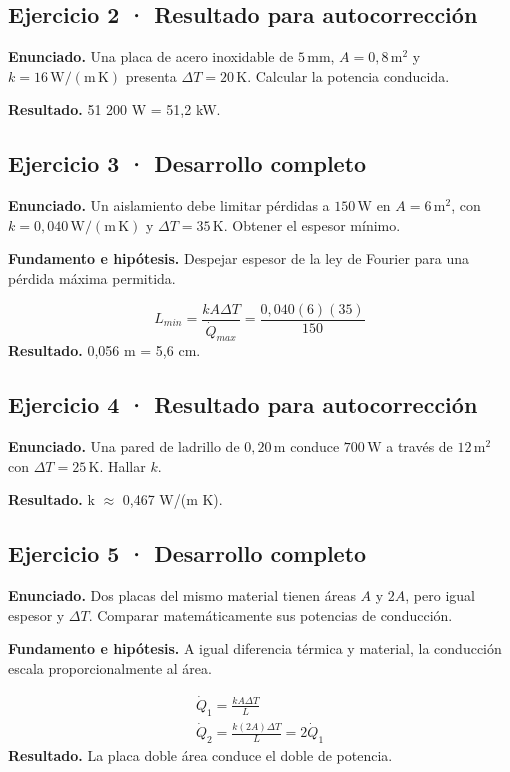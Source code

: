 \documentclass[11pt,a4paper]{article}
\begin{document}
\subsection*{Ejercicio 2 · Resultado para autocorrección}
\textbf{Enunciado.} Una placa de acero inoxidable de \(5\,\mathrm{mm}\), \(A=0{,}8\,\mathrm m^2\) y \(k=16\,\mathrm{W/(m\,K)}\) presenta \(\Delta T=20\,\mathrm K\). Calcular la potencia conducida.

\textbf{Resultado.} 51 200 W = 51,2 kW.


\subsection*{Ejercicio 3 · Desarrollo completo}
\textbf{Enunciado.} Un aislamiento debe limitar pérdidas a \(150\,\mathrm W\) en \(A=6\,\mathrm m^2\), con \(k=0{,}040\,\mathrm{W/(m\,K)}\) y \(\Delta T=35\,\mathrm K\). Obtener el espesor mínimo.

\textbf{Fundamento e hipótesis.} Despejar espesor de la ley de Fourier para una pérdida máxima permitida.

\[
L_{min}=\frac{kA\Delta T}{\dot Q_{max}}=\frac{0{,}040(6)(35)}{150}
\]
\textbf{Resultado.} 0,056 m = 5,6 cm.


\subsection*{Ejercicio 4 · Resultado para autocorrección}
\textbf{Enunciado.} Una pared de ladrillo de \(0{,}20\,\mathrm m\) conduce \(700\,\mathrm W\) a través de \(12\,\mathrm m^2\) con \(\Delta T=25\,\mathrm K\). Hallar \(k\).

\textbf{Resultado.} k \ensuremath{\approx} 0,467 W/(m K).


\subsection*{Ejercicio 5 · Desarrollo completo}
\textbf{Enunciado.} Dos placas del mismo material tienen áreas \(A\) y \(2A\), pero igual espesor y \(\Delta T\). Comparar matemáticamente sus potencias de conducción.

\textbf{Fundamento e hipótesis.} A igual diferencia térmica y material, la conducción escala proporcionalmente al área.

\[
\begin{gathered}
\dot Q_1=\frac{kA\Delta T}{L}\\\dot Q_2=\frac{k(2A)\Delta T}{L}=2\dot Q_1
\end{gathered}
\]
\textbf{Resultado.} La placa doble área conduce el doble de potencia.
\end{document}
